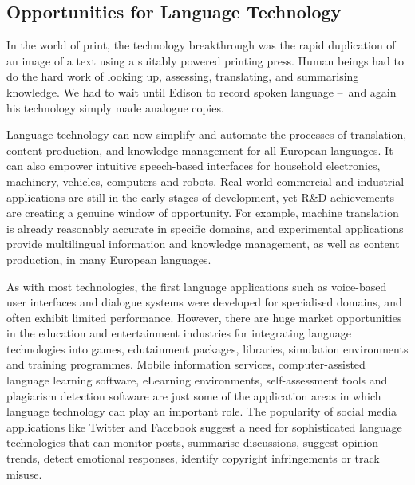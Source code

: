\begin{multicols}{2}
\subsection{Opportunities for Language Technology}

In the world of print, the technology breakthrough was the rapid duplication of an image of a text using a suitably powered printing press. Human beings had to do the hard work of looking up, assessing, translating, and summarising knowledge. We had to wait until Edison to record spoken language --~and again his technology simply made analogue copies.

Language technology can now simplify and automate the processes of translation, content production, and knowledge management for all European languages. It can also empower intuitive speech-based interfaces for household electronics, machinery, vehicles, computers and robots. Real-world commercial and industrial applications are still in the early stages of development, yet R\&D achievements are creating a genuine window of opportunity. For example, machine translation is already reasonably accurate in specific domains, and experimental applications provide multilingual information and knowledge management, as well as content production, in many European languages. 

As with most technologies, the first language applications such as voice-based user interfaces and dialogue systems were developed for specialised domains, and often exhibit limited performance. However, there are huge market opportunities in the education and entertainment industries for integrating language technologies into games, edutainment packages, libraries, simulation environments and training programmes. Mobile information services, computer-assisted language learning software, eLearning environments, self-assessment tools and plagiarism detection software are just some of the application areas in which language technology can play an important role. The popularity of social media applications like Twitter and Facebook suggest a need for sophisticated language technologies that can monitor posts, summarise discussions, suggest opinion trends, detect emotional responses, identify copyright infringements or track misuse.



\end{multicols}

